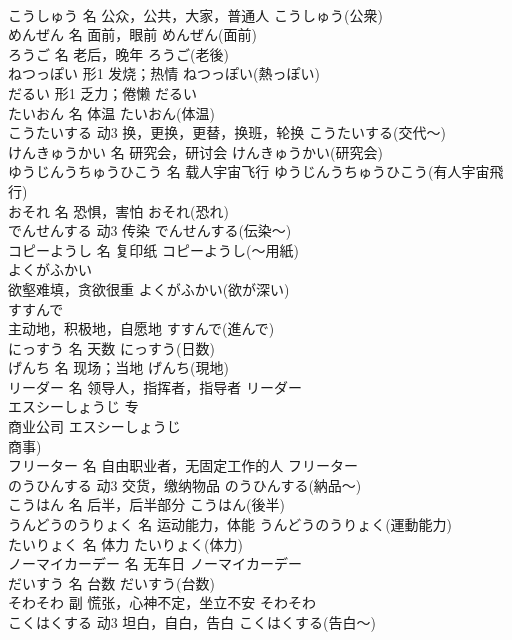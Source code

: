\documentclass[8pt]{extreport}
\begin{document}
\begin{CJK}{UTF8}{min}
\\	こうしゅう	名	公众，公共，大家，普通人	こうしゅう(公衆)	
\\	めんぜん	名	面前，眼前	めんぜん(面前)	
\\	ろうご	名	老后，晚年	ろうご(老後)	
\\	ねつっぽい	形1	发烧；热情	ねつっぽい(熱っぽい)	
\\	だるい	形1	乏力；倦懒	だるい	
\\	たいおん	名	体温	たいおん(体温)	
\\	こうたいする	动3	换，更换，更替，换班，轮换	こうたいする(交代～)	
\\	けんきゅうかい	名	研究会，研讨会	けんきゅうかい(研究会)	
\\	ゆうじんうちゅうひこう	名	载人宇宙飞行	ゆうじんうちゅうひこう(有人宇宙飛行)	
\\	おそれ	名	恐惧，害怕	おそれ(恐れ)	
\\	でんせんする	动3	传染	でんせんする(伝染～)	
\\	コピーようし	名	复印纸	コピーようし(～用紙)	
\\	よくがふかい	
\\	欲壑难填，贪欲很重	よくがふかい(欲が深い)	
\\	すすんで	
\\	主动地，积极地，自愿地	すすんで(進んで)	
\\	にっすう	名	天数	にっすう(日数)	
\\	げんち	名	现场；当地	げんち(現地)	
\\	リーダー	名	领导人，指挥者，指导者	リーダー	
\\	エスシーしょうじ	专	
\\	商业公司	エスシーしょうじ
\\	商事)	
\\	フリーター	名	自由职业者，无固定工作的人	フリーター	
\\	のうひんする	动3	交货，缴纳物品	のうひんする(納品～)	
\\	こうはん	名	后半，后半部分	こうはん(後半)	
\\	うんどうのうりょく	名	运动能力，体能	うんどうのうりょく(運動能力)	
\\	たいりょく	名	体力	たいりょく(体力)	
\\	ノーマイカーデー	名	无车日	ノーマイカーデー	
\\	だいすう	名	台数	だいすう(台数)	
\\	そわそわ	副	慌张，心神不定，坐立不安	そわそわ	
\\	こくはくする	动3	坦白，自白，告白	こくはくする(告白～)	

\end{CJK}
\end{document}
